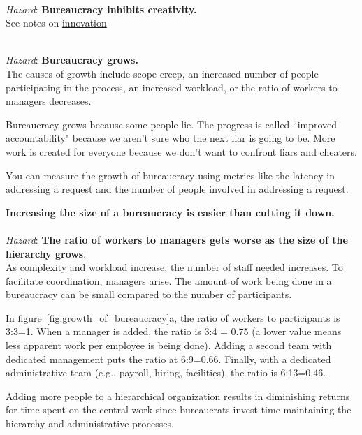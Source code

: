\ \\
\begin{samepage}
\textit{Hazard}: \textbf{Bureaucracy inhibits creativity.}\\
See 
notes on 
\hyperref[sec:innovation]{innovation}\iftoggle{haspagenumbers}{ on page~\pageref{sec:innovation}.}{.}
\end{samepage}

\ \\
\textit{Hazard}: \textbf{Bureaucracy grows.}\\
The causes of growth include
scope creep, an increased number of people participating in the process, an increased workload, or the ratio of workers to managers decreases. 

Bureaucracy grows because some people lie. 
The progress is called ``improved accountability" because we aren't sure who the next liar is going to be.
More work is created for everyone because we don't want to confront  liars and cheaters. 


You can measure the growth of bureaucracy using metrics like the latency in addressing a request and the number of people involved in addressing a request.  

\textbf{Increasing the size of a bureaucracy is easier than cutting it down.}\\


\ \\
\textit{Hazard}: \textbf{The ratio of workers to managers gets worse as the size of the hierarchy grows}. \\
As complexity and workload increase, the number of staff needed increases. To facilitate coordination, managers arise. The amount of work being done in a bureaucracy can be small compared to the number of participants.

In figure~\ref{fig:growth_of_bureaucracy}a, the ratio of workers to participants is 3:3=1. When a manager is added, the ratio is 3:4 = 0.75 (a lower value means less apparent work per employee is being done). Adding a second team with dedicated management puts the ratio at 6:9=0.66. Finally, with a dedicated administrative team (e.g., payroll, hiring, facilities), the ratio is 6:13=0.46.

Adding more people to a hierarchical organization results in diminishing returns for time spent on the central work since bureaucrats invest time maintaining the hierarchy and administrative processes.

